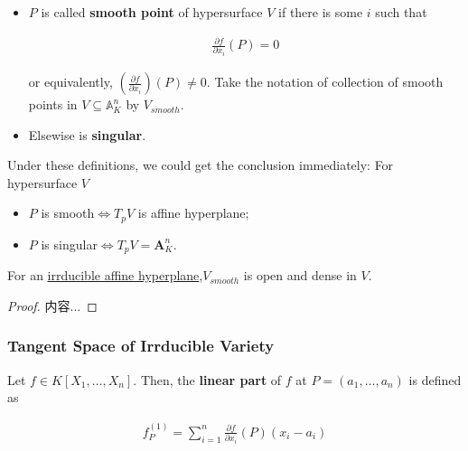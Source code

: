 \documentclass[Total.tex]{subfiles}
\begin{document}
					\begin{Def}
						\begin{itemize}
							\item $P$ is called \textbf{smooth point} of hypersurface $V$ if there is some $i$ such that
							
							\begin{gather*}
								\frac{\partial f}{\partial x_i}(P)=0
							\end{gather*} 
							
							or equivalently, $(\frac{\partial f}{\partial x_i})(P)\not=0$. Take the notation of collection of smooth points in $V\subseteq \mathbb{A}^n_K$ by $V_{smooth}$.
							
							\item Elsewise is \textbf{singular}.
						\end{itemize}
					\end{Def}
					
					Under these definitions, we could get the conclusion immediately: For hypersurface $V$
					
					\begin{itemize}
						\item $P$ is smooth$\Leftrightarrow T_p V$ is affine hyperplane;
						\item $P$ is singular$\Leftrightarrow T_pV=\mathbf{A}^n_K$.  
					\end{itemize}
					
					\begin{proposition}
						For an \underline{irrducible affine hyperplane},$V_{smooth}$ is open and dense in $V$.
					\end{proposition}
					
					\begin{proof}
						内容...
					\end{proof}
					
					\subsubsection{Tangent Space of Irrducible Variety}
					
					\begin{Def}
						Let $f\in K[X_1,\dots,X_n]$. Then, the \textbf{linear part} of $f$ at $P=(a_1,\dots,a_n)$ is defined as
						
						\begin{gather*}
							f^{(1)}_P=\sum_{i=1}^n \frac{\partial f}{\partial x_i}(P)(x_i-a_i)
						\end{gather*}
					\end{Def}
					
\end{document}
